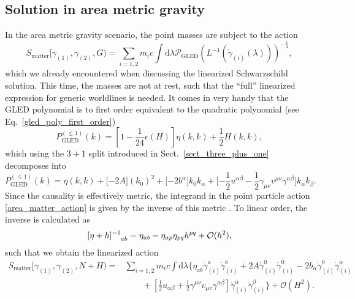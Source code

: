 \subsection{Solution in area metric gravity}
In the area metric gravity scenario, the point masses are subject to the action
\begin{equation}\label{area_matter_action}
  S_\text{matter}\lbrack\gamma_{(1)},\gamma_{(2)},G) = \sum_{i=1,2} m_i c\int\mathrm d\lambda \mathcal P_\text{GLED}(L^{-1}(\dot\gamma_{(i)}(\lambda)))^{-\frac{1}{4}},
\end{equation}
which we already encountered when discussing the linearized Schwarzschild solution. This time, the masses are not at rest, such that the ``full'' linearized expression for generic worldlines is needed. It comes in very handy that the GLED polynomial is to first order equivalent to the quadratic polynomial (see Eq.~\eqref{gled_poly_first_order})
\begin{equation}
  P^{(\leq 1)}_\text{GLED}(k) = [1-\frac{1}{24}\epsilon(H)] \eta(k,k) + \frac{1}{2} H(k,k),
\end{equation}
which using the $3+1$ split introduced in Sect.~\ref{sect_three_plus_one} decomposes into
\begin{equation}\label{area_metric_linearized_poly}
    P^{(\leq 1)}_\text{GLED}(k) = \eta(k,k) + \lbrack -2A\rbrack (k_0)^2 + \lbrack -2b^\alpha\rbrack k_0 k_\alpha + \lbrack -\frac{1}{2} u^{\alpha\beta} - \frac{1}{2} \gamma_{\mu\nu} v^{\mu\nu} \gamma^{\alpha\beta} \rbrack k_\alpha k_\beta.
\end{equation}
Since the causality is effectively metric, the integrand in the point particle action \eqref{area_matter_action} is given by the inverse of this metric \cite{sergio}. To linear order, the inverse is calculated as
\begin{equation}\label{area_matter_linearized_poly}
  \lbrack\eta + h\rbrack^{-1}_{\hphantom{-1}ab} = \eta_{ab} - \eta_{ap}\eta_{pq} h^{pq} + \mathcal O(h^2),
\end{equation}
such that we obtain the linearized action
\begin{equation}\label{area_linearized_matter_action}
  \begin{aligned}
    S_\text{matter}\lbrack\gamma_{(1)},\gamma_{(2)},N+H) = {} & \sum_{i=1,2} m_i c\int\mathrm d\lambda \Big\{ \eta_{ab}\dot\gamma^a_{(i)}\dot\gamma^b_{(i)} + 2A\dot\gamma^0_{(i)}\dot\gamma^0_{(i)} - 2b_\alpha\dot\gamma^0_{(i)}\dot\gamma^\alpha_{(i)} \\
    {} & \quad\quad + \left\lbrack\frac{1}{2}u_{\alpha\beta} + \frac{1}{2}\gamma^{\mu\nu}v_{\mu\nu}\gamma^{\alpha\beta}\right\rbrack \dot\gamma^\alpha_{(i)} \dot\gamma^\beta_{(i)} \Big\} + \mathcal O(H^2).
  \end{aligned}
\end{equation}

